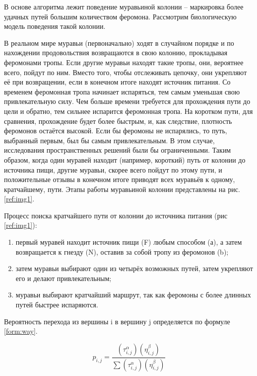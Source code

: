 В основе алгоритма лежит поведение муравьиной колонии -- маркировка более удачных
путей большим количеством феромона.
Рассмотрим биологическую модель поведения такой колонии.

В реальном мире муравьи (первоначально) ходят в случайном порядке и по нахождении
продовольствия возвращаются в свою колонию, прокладывая феромонами тропы.
Если другие муравьи находят такие тропы, они, вероятнее всего, пойдут по ним.
Вместо того, чтобы отслеживать цепочку, они укрепляют её при возвращении,
если в конечном итоге находят источник питания. Со временем феромонная тропа
начинает испаряться, тем самым уменьшая свою привлекательную силу. Чем больше
времени требуется для прохождения пути до цели и обратно, тем сильнее испарится
феромонная тропа. На коротком пути, для сравнения, прохождение будет более быстрым,
и, как следствие, плотность феромонов остаётся высокой.
Если бы феромоны не испарялись, то путь, выбранный первым,
был бы самым привлекательным. В этом случае, исследования пространственных
решений были бы ограниченными. Таким образом, когда один муравей находит
(например, короткий) путь от колонии до источника пищи, другие муравьи,
скорее всего пойдут по этому пути, и положительные отзывы в конечном итоге
приводят всех муравьёв к одному, кратчайшему, пути. Этапы работы муравьиной
колонии представлены на рис. \ref{ref:img1}.

\begin{figure}[ht!]
\end{figure}

Процесс поиска кратчайшего пути от колонии до источника питания (рис \ref{ref:img1}):

\begin{enumerate}
	\item первый муравей находит источник пищи (F) любым способом (а), а затем возвращается к гнезду (N), оставив за собой тропу из феромонов (b);
	\item затем муравьи выбирают один из четырёх возможных путей, затем укрепляют его и делают привлекательным;
	\item муравьи выбирают кратчайший маршрут, так как феромоны с более длинных путей быстрее испаряются.
\end{enumerate}


Вероятность перехода из вершины i в вершину j определяется по формуле \ref{form:way}.

\begin{equation}\label{form:way}
	p_{i,j}={\frac {(\tau_{i,j}^{\alpha })(\eta_{i,j}^{\beta })}{\sum (\tau_{i,j}^{\alpha })(\eta_{i,j}^{\beta })}}
\end{equation}

